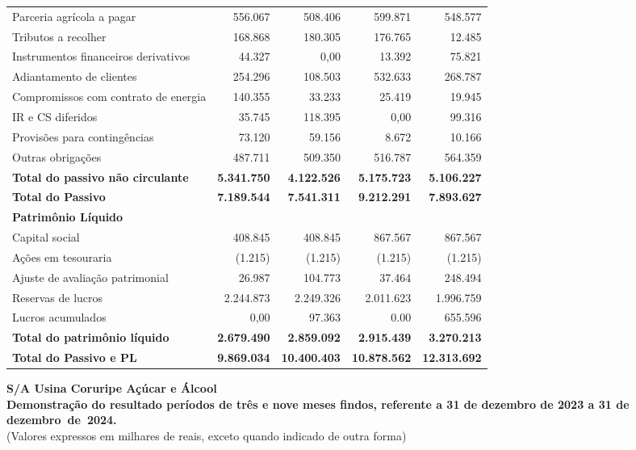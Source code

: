 \documentclass[1pt,a4paper]{article}
\begin{document}
\begin{longtable}{p{6cm} r r r r}
			Parceria agrícola a pagar & 556.067 & 508.406 & 599.871 & 548.577 \\
			Tributos a recolher & 168.868 & 180.305 & 176.765 & 12.485 \\
			Instrumentos financeiros derivativos & 44.327 & 0,00 & 13.392 & 75.821 \\
			Adiantamento de clientes & 254.296 & 108.503 & 532.633 & 268.787 \\
			Compromissos com contrato de energia & 140.355 & 33.233 & 25.419 & 19.945 \\
			IR e CS diferidos & 35.745 & 118.395 & 0,00 & 99.316 \\
			Provisões para contingências & 73.120 & 59.156 & 8.672 & 10.166 \\
			Outras obrigações & 487.711 & 509.350 & 516.787 & 564.359 \\
			\rowcolor{darkgray}\textbf{Total do passivo não circulante} & \textbf{5.341.750} & \textbf{4.122.526} & \textbf{5.175.723} & \textbf{5.106.227} \\
			\midrule
			\rowcolor{darkgray}\textbf{Total do Passivo} & \textbf{7.189.544} & \textbf{7.541.311} & \textbf{9.212.291} & \textbf{7.893.627} \\
			\midrule
			
			\textbf{Patrimônio Líquido} & & & & \\
			Capital social & 408.845 & 408.845 & 867.567 & 867.567 \\
			Ações em tesouraria & (1.215) & (1.215) & (1.215) & (1.215) \\
			Ajuste de avaliação patrimonial & 26.987 & 104.773 & 37.464 & 248.494\\
			Reservas de lucros & 2.244.873 & 2.249.326 & 2.011.623 & 1.996.759 \\
			Lucros acumulados & 0,00 & 97.363 & 0.00 & 655.596 \\
			\rowcolor{darkgray}\textbf{Total do patrimônio líquido} & \textbf{2.679.490} & \textbf{2.859.092} & \textbf{2.915.439} & \textbf{3.270.213} \\
			\midrule
			\rowcolor{darkgray}\textbf{Total do Passivo e PL} & \textbf{9.869.034} & \textbf{10.400.403} & \textbf{10.878.562} & \textbf{12.313.692} \\
			\bottomrule
		\end{longtable}
		
\newpage
		
		\begin{center}
			\textbf{\Large S/A Usina Coruripe Açúcar e Álcool}\\
			\textbf{Demonstração do resultado períodos de três e nove meses findos, referente a 31 de dezembro de 2023 a 31 de dezembro de 2024.}\\
			(Valores expressos em milhares de reais, exceto quando indicado de outra forma)
		\end{center}
	
\end{document}
